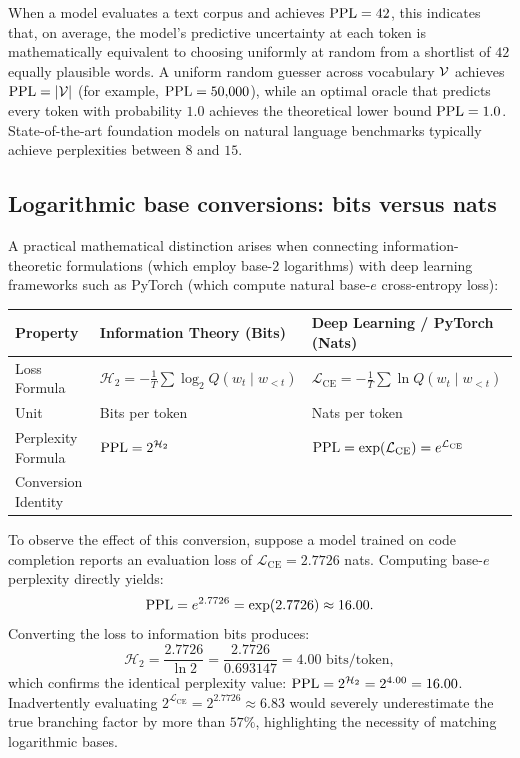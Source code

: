 \documentclass[../../main.tex]{subfiles}
\begin{document}
When a model evaluates a text corpus and achieves $\mathrm{PPL} = 42$, this indicates that, on average, the model's predictive uncertainty at each token is mathematically equivalent to choosing uniformly at random from a shortlist of $42$ equally plausible words. A uniform random guesser across vocabulary $\mathcal{V}$ achieves $\mathrm{PPL} = |\mathcal{V}|$ (for example, $\mathrm{PPL} = 50{,}000$), while an optimal oracle that predicts every token with probability $1.0$ achieves the theoretical lower bound $\mathrm{PPL} = 1.0$. State-of-the-art foundation models on natural language benchmarks typically achieve perplexities between $8$ and $15$.

\subsection{Logarithmic base conversions: bits versus nats}
\label{subsec:log_base_conversions}

A practical mathematical distinction arises when connecting information-theoretic formulations (which employ base-$2$ logarithms) with deep learning frameworks such as PyTorch (which compute natural base-$e$ cross-entropy loss):
\begin{center}
\begin{tabularx}{\linewidth}{l >{\raggedright\arraybackslash}X >{\raggedright\arraybackslash}X}
\toprule
\textbf{Property} & \textbf{Information Theory (Bits)} & \textbf{Deep Learning / PyTorch (Nats)} \\
\midrule
Loss Formula & $\mathcal{H}_2 = -\frac{1}{T} \sum \log_2 Q(w_t \mid w_{<t})$ & $\mathcal{L}_{\text{CE}} = -\frac{1}{T} \sum \ln Q(w_t \mid w_{<t})$ \\
Unit & Bits per token & Nats per token \\
Perplexity Formula & $\mathrm{PPL} = 2^{\mathcal{H}_2}$ & $\mathrm{PPL} = \exp(\mathcal{L}_{\text{CE}}) = e^{\mathcal{L}_{\text{CE}}}$ \\
Conversion Identity & \multicolumn{2}{c}{$\mathcal{H}_2 = \frac{\mathcal{L}_{\text{CE}}}{\ln 2} \approx \frac{\mathcal{L}_{\text{CE}}}{0.693147}, \quad \mathcal{L}_{\text{CE}} = \mathcal{H}_2 \cdot \ln 2 \approx 0.693147 \cdot \mathcal{H}_2$} \\
\bottomrule
\end{tabularx}
\end{center}

To observe the effect of this conversion, suppose a model trained on code completion reports an evaluation loss of $\mathcal{L}_{\text{CE}} = 2.7726$ nats. Computing base-$e$ perplexity directly yields:
\[
\mathrm{PPL} = e^{2.7726} = \exp(2.7726) \approx 16.00.
\]
Converting the loss to information bits produces:
\[
\mathcal{H}_2 = \frac{2.7726}{\ln 2} = \frac{2.7726}{0.693147} = 4.00 \text{ bits/token},
\]
which confirms the identical perplexity value: $\mathrm{PPL} = 2^{\mathcal{H}_2} = 2^{4.00} = 16.00$. Inadvertently evaluating $2^{\mathcal{L}_{\text{CE}}} = 2^{2.7726} \approx 6.83$ would severely underestimate the true branching factor by more than $57\%$, highlighting the necessity of matching logarithmic bases.
\end{document}
